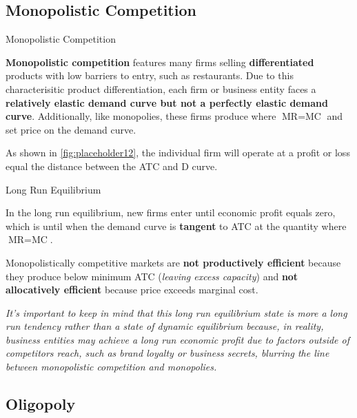\documentclass[10pt]{article}
\begin{document}
  \subsection{Monopolistic Competition}

    \begin{core}{Monopolistic Competition}

      \textbf{Monopolistic competition} features many firms selling \textbf{differentiated} products with low barriers to entry, such as restaurants. Due to this characterisitic product differentiation, each firm or business entity faces a \textbf{relatively elastic demand curve but not a perfectly elastic demand curve}. Additionally, like monopolies, these firms produce where $\text{MR} = \text{MC}$ and set price on the demand curve.


      As shown in \autoref{fig:placeholder12}, the individual firm will operate at a profit or loss equal the distance between the ATC and D curve.

    \end{core}

    \begin{core}{Long Run Equilibrium}

      In the long run equilibrium, new firms enter until economic profit equals zero, which is until when the demand curve is \textbf{tangent} to ATC at the quantity where $\text{MR} = \text{MC}$.


      Monopolistically competitive markets are \textbf{not productively efficient} because they produce below minimum ATC (\textit{leaving excess capacity}) and \textbf{not allocatively efficient} because price exceeds marginal cost.

      \textit{It's important to keep in mind that this long run equilibrium state is more a long run tendency rather than a state of dynamic equilibrium because, in reality, business entities may achieve a long run economic profit due to factors outside of competitors reach, such as brand loyalty or business secrets, blurring the line between monopolistic competition and monopolies. }

    \end{core}

  \subsection{Oligopoly}
\end{document}
